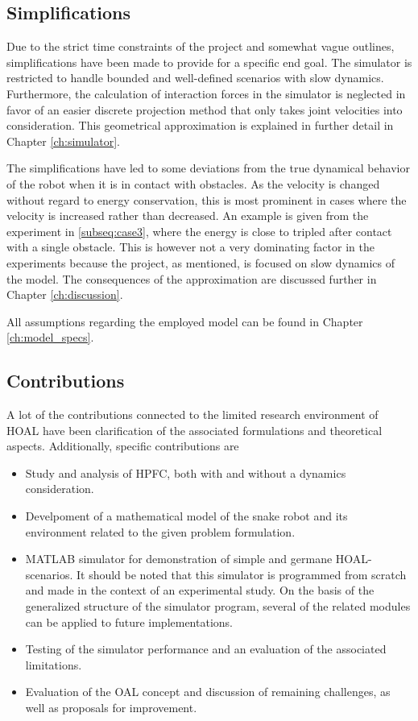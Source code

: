 \subsection{Simplifications}
Due to the strict time constraints of the project and somewhat vague outlines, simplifications have been made to provide for a specific end goal. The simulator is restricted to handle bounded and well-defined scenarios with slow dynamics. Furthermore, the calculation of interaction forces in the simulator is neglected in favor of an easier discrete projection method that only takes joint velocities into consideration. This geometrical approximation is explained in further detail in Chapter \ref{ch:simulator}.

The simplifications have led to some deviations from the true dynamical behavior of the robot when it is in contact with obstacles. As the velocity is changed without regard to energy conservation, this is most prominent in cases where the velocity is increased rather than decreased. An example is given from the experiment in \ref{subseq:case3}, where the energy is close to tripled after contact with a single obstacle.
This is however not a very dominating factor in the experiments because the project, as mentioned, is focused on slow dynamics of the model. The consequences of the approximation are discussed further in Chapter \ref{ch:discussion}.

All assumptions regarding the employed model can be found in Chapter \ref{ch:model_specs}.

\subsection{Contributions}
A lot of the contributions connected to the limited research environment of HOAL have been clarification of the associated formulations and theoretical aspects.
Additionally, specific contributions are 

\begin{itemize}
    \item Study and analysis of HPFC, both with and without a dynamics consideration.
    \item Develpoment of a mathematical model of the snake robot and its environment           related to the given problem formulation.
    \item MATLAB simulator for demonstration of simple and germane HOAL-scenarios.
        It should be noted that this simulator is programmed from scratch and made in the context of an experimental study.
        On the basis of the generalized structure of the simulator program, several of the related modules can be applied to future implementations.
    \item Testing of the simulator performance and an evaluation of the associated             limitations.
    \item Evaluation of the OAL concept and discussion of remaining challenges, as well     as proposals for improvement.
\end{itemize}


